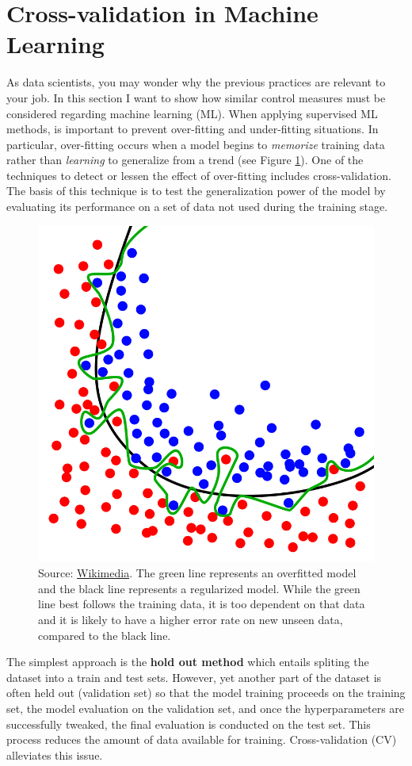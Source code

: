 \documentclass[
]{book}
\begin{document}
\hypertarget{cross-validation-in-machine-learning}{%
\section{Cross-validation in Machine Learning}\label{cross-validation-in-machine-learning}}

As data scientists, you may wonder why the previous practices are relevant to your job. In this section I want to show how similar control measures must be considered regarding machine learning (ML). When applying supervised ML methods, is important to prevent over-fitting and under-fitting situations. In particular, over-fitting occurs when a model begins to \emph{memorize} training data rather than \emph{learning} to generalize from a trend (see Figure \ref{fig:overfitting}). One of the techniques to detect or lessen the effect of over-fitting includes cross-validation. The basis of this technique is to test the generalization power of the model by evaluating its performance on a set of data not used during the training stage.



\begin{figure}

{\centering \includegraphics[width=0.45\linewidth]{Figures/Overfitting} 

}

\caption{Source: \href{https://en.wikipedia.org/wiki/File:Overfitting.svg}{Wikimedia}. The green line represents an overfitted model and the black line represents a regularized model. While the green line best follows the training data, it is too dependent on that data and it is likely to have a higher error rate on new unseen data, compared to the black line.}\label{fig:overfitting}
\end{figure}

The simplest approach is the \textbf{hold out method} which entails spliting the dataset into a train and test sets. However, yet another part of the dataset is often held out (validation set) so that the model training proceeds on the training set, the model evaluation on the validation set, and once the hyperparameters are successfully tweaked, the final evaluation is conducted on the test set. This process reduces the amount of data available for training. Cross-validation (CV) alleviates this issue.
\end{document}
